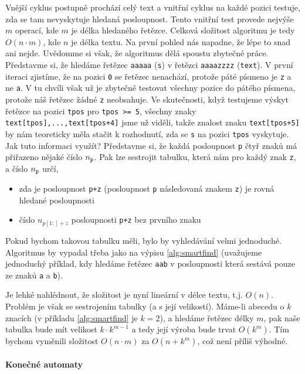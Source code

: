 Vnější cyklus postupně prochází celý text a vnitřní cyklus na každé pozici testuje, zda
se tam nevyskytuje hledaná posloupnost. Tento vnitřní test provede nejvýše \(m\) operací,
kde \(m\) je délka hledaného řetězce. Celková složitost algoritmu je tedy \(O(n\cdot m)\), 
kde \(n\) je délka textu. Na první pohled nás napadne, že lépe to snad ani nejde. 
Uvědomme si však, že algoritmus dělá spoustu zbytečné práce. Představme si, že hledáme
řetězec {\tt aaaaa} ({\tt s}) v řetězci {\tt aaaazzzz} ({\tt text}). V první iteraci zjistíme, že na pozici {\tt 0}
se řetězec nenachází, protože páté písmeno je {\tt z} a ne {\tt a}. V tu chvíli však už je
zbytečné testovat všechny pozice do pátého písmena, protože náš řetězec žádné
{\tt z} neobsahuje.  Ve skutečnosti,  když testujeme výskyt řetězce na pozici {\tt tpos}
pro {\tt tpos >= 5}, všechny znaky {\tt text[tpos],...,text[tpos+4]} jsme už viděli, takže
znalost znaku {\tt text[tpos+5]} by nám teoreticky měla stačit k rozhodnutí, zda se
{\tt s} na pozici {\tt tpos} vyskytuje. Jak tuto informaci využít? Představme si, že každá
posloupnost {\tt p} čtyř znaků má přiřazeno nějaké číslo \(n_{\tt p}\). Pak lze sestrojit
tabulku, která nám pro každý znak {\tt z}, a číslo \(n_{\tt p}\) určí, 

\begin{itemize}
 \item zda je posloupnost {\tt p+z} (posloupnost {\tt p} následovaná znakem {\tt z}) je rovná hledané posloupnosti
 \item číslo \(n_{p[1:]+z}\) posloupnosti {\tt p+z} bez prvního znaku
\end{itemize}

Pokud bychom takovou tabulku měli, bylo by vyhledávání velmi jednoduché. Algoritmus
by vypadal třeba jako na výpisu \ref{alg:smartfind} (uvažujeme jednoduchý příklad, kdy
hledáme řetězec {\tt aab} v posloupnosti která sestává pouze ze znaků {\tt a} a {\tt b}).


Je lehké nahlédnout, že složitost je nyní lineární v délce textu, t.j. \(O(n)\). Problém je
však se sestrojením tabulky (a s její velikostí). Máme-li abecedu o \(k\) znacích
(v příkladu \ref{alg:smartfind} je \(k=2\)), a hledáme řetězec délky \(m\), pak naše tabulka
bude mít velikost \(k\cdot k^{m-1}\) a tedy její výroba bude trvat \(O(k^{m})\). 
Tím bychom vyměnili složitost \(O(n\cdot m)\) za \(O(n+k^{m})\), což není příliš výhodné.

\paragraph{Konečné automaty}

